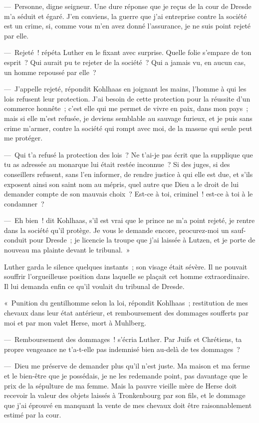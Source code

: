 \documentclass[french,twoside]{book} %
\begin{document}
— Personne, digne seigneur. Une dure réponse que je reçus de la cour de Dresde m’a séduit et égaré. J’en conviens, la guerre que j’ai entreprise contre la société est un crime, si, comme vous m’en avez donné l’assurance, je ne suis point rejeté par elle.\par
— Rejeté ! répéta Luther en le fixant avec surprise. Quelle folie s’empare de ton esprit ? Qui aurait pu te rejeter de la société ? Qui a jamais vu, en aucun cas, un homme repoussé par elle ?\par
— J’appelle rejeté, répondit Kohlhaas en joignant les mains, l’homme à qui les lois refusent leur protection. J’ai besoin de cette protection pour la réussite d’un commerce honnête ; c’est elle qui me permet de vivre en paix, dans mon pays ; mais si elle m’est refusée, je deviens semblable au sauvage furieux, et je puis sans crime m’armer, contre la société qui rompt avec moi, de la massue qui seule peut me protéger.\par
— Qui t’a refusé la protection des lois ? Ne t’ai-je pas écrit que la supplique que tu as adressée au monarque lui était restée inconnue ? Si des juges, si des conseillers refusent, sans l’en informer, de rendre justice à qui elle est due, et s’ils exposent ainsi son saint nom au mépris, quel autre que Dieu a le droit de lui demander compte de son mauvais choix ? Est-ce à toi, criminel ! est-ce à toi à le condamner ?\par
— Eh bien ! dit Kohlhaas, s’il est vrai que le prince ne m’a point rejeté, je rentre dans la société qu’il protège. Je vous le demande encore, procurez-moi un sauf-conduit pour Dresde ; je licencie la troupe que j’ai laissée à Lutzen, et je porte de nouveau ma plainte devant le tribunal. »\par
Luther garda le silence quelques instants ; son visage était sévère. Il ne pouvait souffrir l’orgueilleuse position dans laquelle se plaçait cet homme extraordinaire. Il lui demanda enfin ce qu’il voulait du tribunal de Dresde.\par
« Punition du gentilhomme selon la loi, répondit Kohlhaas ; restitution de mes chevaux dans leur état antérieur, et remboursement des dommages soufferts par moi et par mon valet Herse, mort à Muhlberg.\par
— Remboursement des dommages ! s’écria Luther. Par Juifs et Chrétiens, ta propre vengeance ne t’a-t-elle pas indemnisé bien au-delà de tes dommages ?\par
— Dieu me préserve de demander plus qu’il n’est juste. Ma maison et ma ferme et le bien-être que je possédais, je ne les redemande point, pas davantage que le prix de la sépulture de ma femme. Mais la pauvre vieille mère de Herse doit recevoir la valeur des objets laissés à Tronkenbourg par son fils, et le dommage que j’ai éprouvé en manquant la vente de mes chevaux doit être raisonnablement estimé par la cour.\par
\end{document}
